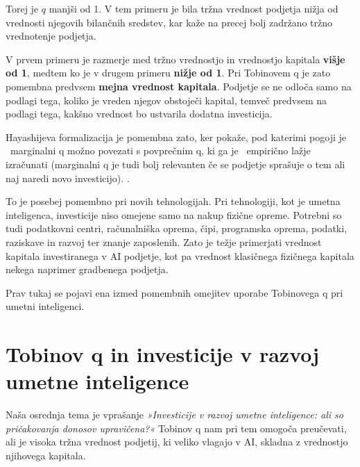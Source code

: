 \documentclass[12pt,a4paper]{article}
\begin{document}
Torej je $q$ manjši od 1. V tem primeru je bila tržna vrednost podjetja nižja od vrednosti njegovih bilančnih sredstev, kar kaže na precej bolj zadržano tržno vrednotenje podjetja.

V prvem primeru je razmerje med tržno vrednostjo in vrednostjo kapitala \textbf{višje od 1}, medtem ko je v drugem primeru \textbf{nižje od 1}.
Pri Tobinovem q je zato pomembna predvsem \textbf{mejna vrednost kapitala}. Podjetje se ne odloča samo na podlagi tega,
koliko je vreden njegov obstoječi kapital, temveč predvsem na podlagi tega, kakšno vrednost bo ustvarila dodatna investicija.


Hayashijeva formalizacija je pomembna zato, ker pokaže, pod katerimi pogoji je  marginalni q možno povezati s povprečnim q,
ki ga je  empirično lažje izračunati (marginalni q je tudi bolj relevanten če se podjetje sprašuje o tem ali naj naredi novo investicijo).
\citep{AndreiMannMoyen2017}.

To je posebej pomembno pri novih tehnologijah. Pri tehnologiji, kot je umetna inteligenca, investicije niso
omejene samo na nakup fizične opreme. Potrebni so tudi podatkovni centri, računalniška oprema, čipi, programska oprema,
podatki, raziskave in razvoj ter znanje zaposlenih. Zato je težje primerjati vrednost kapitala investiranega v AI podjetje, 
kot pa vrednost klasičnega fizičnega kapitala nekega naprimer gradbenega podjetja.





Prav tukaj se pojavi ena izmed pomembnih omejitev uporabe Tobinovega q pri umetni inteligenci.






\section{Tobinov q in investicije v razvoj umetne inteligence}


Naša osrednja tema je vprašanje \textit{»Investicije v razvoj umetne inteligence: ali so pričakovanja donosov upravičena?«}
Tobinov q nam pri tem omogoča preučevati, ali je visoka tržna vrednost podjetij, ki veliko vlagajo v AI, skladna z vrednostjo njihovega kapitala.
\end{document}
